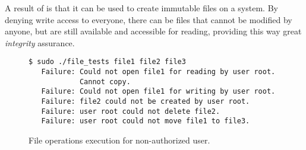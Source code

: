 \par A result of  is that it can be used to create immutable files on a system. By denying write access to everyone, there can be files that cannot be modified by anyone, but are still available and accessible for reading, providing this way great \emph{integrity} assurance.

\begin{figure}[ht]
	\centering
	\footnotesize{\selectfont 
		\begin{lstlisting}
$ sudo ./file_tests file1 file2 file3
   Failure: Could not open file1 for reading by user root. 
            Cannot copy.
   Failure: Could not open file1 for writing by user root.
   Failure: file2 could not be created by user root.
   Failure: user root could not delete file2.
   Failure: user root could not move file1 to file3.

		\end{lstlisting}}
	\caption{File operations execution for non-authorized user.}
	\label{fig:results2}
\end{figure}





